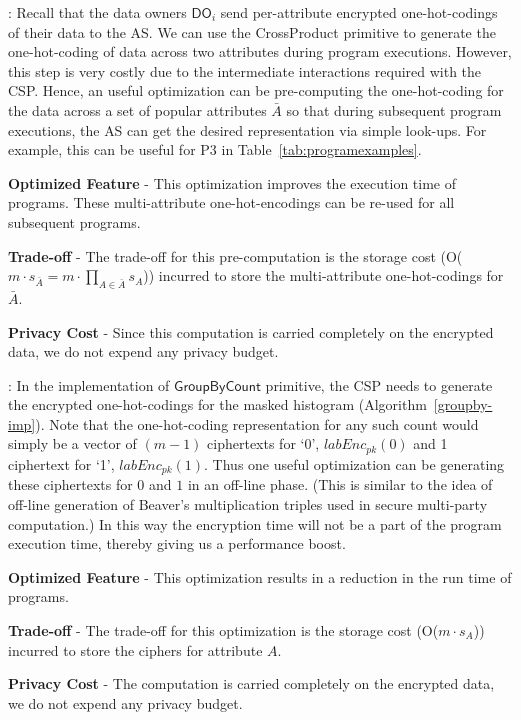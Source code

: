 :  
Recall that the data owners $\textsf{DO}_i$ send per-attribute encrypted one-hot-codings of their data to the \textsf{AS}. We can use the \textsf{CrossProduct} primitive to generate the one-hot-coding of data across two attributes during program executions. However, this step is very costly due to the intermediate interactions required with the \textsf{CSP}. Hence, an  useful optimization can be  pre-computing the one-hot-coding for the data across a set of popular attributes $\bar{A}$ so that during subsequent program executions, the \textsf{AS} can get the desired representation via simple look-ups. For example, this can be useful for P3 in Table~\ref{tab:programexamples}.
\squishlist
\item \textbf{Optimized Feature} - This optimization improves the execution time of \system programs. These multi-attribute one-hot-encodings can be re-used for all subsequent programs.
\item  \textbf{Trade-off} - The trade-off for this pre-computation is the storage cost (O($m\cdot s_{\bar{A}}=m\cdot \prod_{A \in \bar{A}}s_A$)) incurred to store the multi-attribute one-hot-codings for $\bar{A}$.
\item \textbf{Privacy Cost} - Since this computation is carried completely on the encrypted data, we do not expend any privacy budget.
\squishend

:
In the implementation of $\textsf{GroupByCount}$ primitive, the \textsf{CSP} needs to generate the encrypted one-hot-codings for the masked histogram (Algorithm~\ref{groupby-imp}). Note that the one-hot-coding representation for any such count would simply be a vector of $(m-1)$ ciphertexts for `0', $labEnc_{pk}(0)$ and 1 ciphertext for `1', $labEnc_{pk}(1)$. Thus one useful optimization can be generating these ciphertexts for $0$ and $1$ in an off-line phase. (This is similar to the idea of off-line generation of Beaver's multiplication triples \cite{Beaver} used in secure multi-party computation.) In this way the encryption time will not be a part of the program execution time, thereby giving us a performance boost.
\squishlist
\item \textbf{Optimized Feature} - This optimization results in a reduction in the run time of \system programs. 
\item \textbf{Trade-off} - The trade-off for this optimization is the storage cost (O($m\cdot s_A$)) incurred to store the ciphers for attribute $A$.
\item \textbf{Privacy Cost} - The computation is carried completely on the encrypted data, we do not expend any privacy budget.
\squishend

